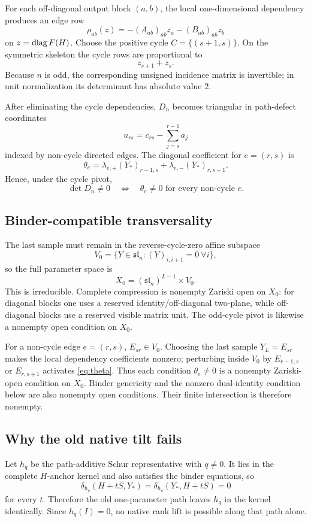 For each off-diagonal output block $(a,b)$, the local one-dimensional dependency produces an edge row
\[
\rho_{ab}(z)=-(A_{ab})_{ab}z_a-(B_{ab})_{ab}z_b
\]
on $z=\operatorname{diag} F(H)$. Choose the positive cycle $C=\{(s+1,s)\}$. On the symmetric skeleton the cycle rows are proportional to
\[
z_{s+1}+z_s.
\]
Because $n$ is odd, the corresponding unsigned incidence matrix is invertible; in unit normalization its determinant has absolute value $2$.

After eliminating the cycle dependencies, $D_n$ becomes triangular in path-defect coordinates
\[
u_{rs}=c_{rs}-\sum_{j=s}^{r-1}a_j
\]
indexed by non-cycle directed edges. The diagonal coefficient for $e=(r,s)$ is
\begin{equation}\label{eq:theta}
\theta_e=\lambda_{e,+}(Y_*)_{r-1,s}+\lambda_{e,-}(Y_*)_{r,s+1}.
\end{equation}
Hence, under the cycle pivot,
\[
\det D_n\ne0
\quad\Longleftrightarrow\quad
\theta_e\ne0\text{ for every non-cycle }e.
\]

\subsection{Binder-compatible transversality}
The last sample must remain in the reverse-cycle-zero affine subspace
\[
V_0=\{Y\in\mathfrak{sl}_n:(Y)_{i,i+1}=0\ \forall i\},
\]
so the full parameter space is
\[
X_0=(\mathfrak{sl}_n)^{L-1}\times V_0.
\]
This is irreducible. Complete compression is nonempty Zariski open on $X_0$: for diagonal blocks one uses a reserved identity/off-diagonal two-plane, while off-diagonal blocks use a reserved visible matrix unit. The odd-cycle pivot is likewise a nonempty open condition on $X_0$.

For a non-cycle edge $e=(r,s)$, $E_{sr}\in V_0$. Choosing the last sample $Y_L=E_{sr}$ makes the local dependency coefficients nonzero; perturbing inside $V_0$ by $E_{r-1,s}$ or $E_{r,s+1}$ activates \eqref{eq:theta}. Thus each condition $\theta_e\ne0$ is a nonempty Zariski-open condition on $X_0$. Binder genericity and the nonzero dual-identity condition below are also nonempty open conditions. Their finite intersection is therefore nonempty.

\subsection{Why the old native tilt fails}
Let $h_q$ be the path-additive Schur representative with $q\ne0$. It lies in the complete $H$-anchor kernel and also satisfies the binder equations, so
\[
\delta_{h_q}(H+tS,Y_*)=\delta_{h_q}(Y_*,H+tS)=0
\]
for every $t$. Therefore the old one-parameter path leaves $h_q$ in the kernel identically. Since $h_q(I)=0$, no native rank lift is possible along that path alone.

